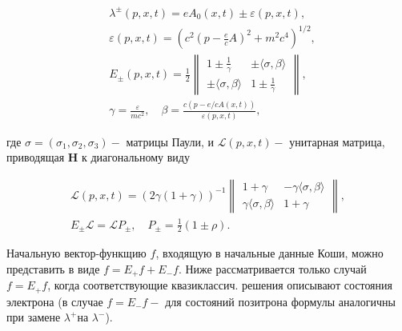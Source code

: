 \documentclass[10pt]{article}
\begin{document}
\[

\begin{aligned}

& \lambda^{ \pm}(p, x, t)=e A_{0}(x, t) \pm \varepsilon(p, x, t), \\

& \varepsilon(p, x, t)=\left(c^{2}\left(p-\frac{e}{c} A\right)^{2}+m^{2} c^{4}\right)^{1 / 2}, \\

& E_{ \pm}(p, x, t)=\frac{1}{2}\left\|\begin{array}{cc}

1 \pm \frac{1}{\gamma} & \pm\langle\sigma, \beta\rangle \\

\pm\langle\sigma, \beta\rangle & 1 \pm \frac{1}{\gamma}

\end{array}\right\|, \\

& \gamma=\frac{\varepsilon}{m c^{2}}, \quad \beta=\frac{c(p-e / c A(x, t))}{\varepsilon(p, x, t)},

\end{aligned}

\]



где $\sigma=\left(\sigma_{1}, \sigma_{2}, \sigma_{3}\right)-$ матрицы Паули, и $\mathscr{L}(p, x, t)-$ унитарная матрица, приводящая $\boldsymbol{H}$ к диагональному виду



\[

\begin{gathered}

\mathscr{L}(p, x, t)=(2 \gamma(1+\gamma))^{-1}\left\|\begin{array}{cc}

1+\gamma & -\gamma\langle\sigma, \beta\rangle \\

\gamma\langle\sigma, \beta\rangle & 1+\gamma

\end{array}\right\|, \\

E_{ \pm} \mathscr{L}=\mathscr{L} P_{ \pm}, \quad P_{ \pm}=\frac{1}{2}(1 \pm \rho) .

\end{gathered}

\]



Начальную вектор-функщию $f$, входящую в начальные данные Коши, можно представить в виде $f=E_{+} f+E_{-} f$. Ниже рассматривается только случай $f=E_{+} f$, когда соответствующие квазиклассич. решения описывают состояния электрона (в случае $f=E_{-} f-$ для состояний позитрона формулы аналогичны при замене $\lambda^{+}$на $\lambda^{-}$).
\end{document}
